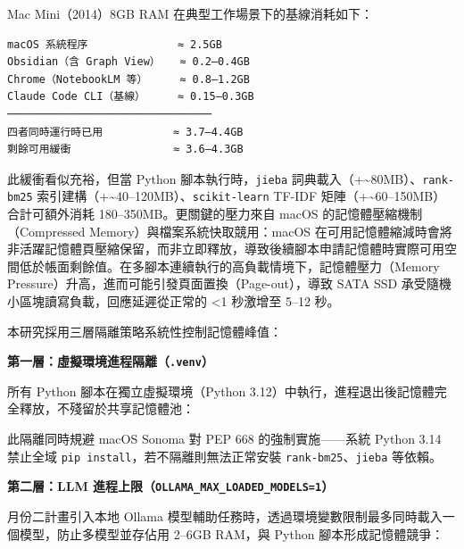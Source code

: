 Mac Mini（2014）8GB RAM 在典型工作場景下的基線消耗如下：

\begin{verbatim}
macOS 系統程序              ≈ 2.5GB
Obsidian（含 Graph View）   ≈ 0.2–0.4GB
Chrome（NotebookLM 等）     ≈ 0.8–1.2GB
Claude Code CLI（基線）     ≈ 0.15–0.3GB
────────────────────────────────
四者同時運行時已用           ≈ 3.7–4.4GB
剩餘可用緩衝                ≈ 3.6–4.3GB
\end{verbatim}

此緩衝看似充裕，但當 Python 腳本執行時，\texttt{jieba}
詞典載入（+\textasciitilde80MB）、\texttt{rank-bm25}
索引建構（+\textasciitilde40--120MB）、\texttt{scikit-learn} TF-IDF
矩陣（+\textasciitilde60--150MB）合計可額外消耗
180--350MB。更關鍵的壓力來自 macOS 的記憶體壓縮機制（Compressed
Memory）與檔案系統快取競用：macOS
在可用記憶體縮減時會將非活躍記憶體頁壓縮保留，而非立即釋放，導致後續腳本申請記憶體時實際可用空間低於帳面剩餘值。在多腳本連續執行的高負載情境下，記憶體壓力（Memory
Pressure）升高，進而可能引發頁面置換（Page-out），導致 SATA SSD
承受隨機小區塊讀寫負載，回應延遲從正常的 \textless1 秒激增至 5--12 秒。

本研究採用三層隔離策略系統性控制記憶體峰值：

\textbf{第一層：虛擬環境進程隔離（\texttt{.venv}）}

所有 Python 腳本在獨立虛擬環境（Python
3.12）中執行，進程退出後記憶體完全釋放，不殘留於共享記憶體池：

\begin{Shaded}
\begin{Highlighting}[]
 

\end{Highlighting}
\end{Shaded}

此隔離同時規避 macOS Sonoma 對 PEP 668 的強制實施------系統 Python 3.14
禁止全域 \texttt{pip\ install}，若不隔離則無法正常安裝
\texttt{rank-bm25}、\texttt{jieba} 等依賴。

\textbf{第二層：LLM 進程上限（\texttt{OLLAMA\_MAX\_LOADED\_MODELS=1}）}

月份二計畫引入本地 Ollama
模型輔助任務時，透過環境變數限制最多同時載入一個模型，防止多模型並存佔用
2--6GB RAM，與 Python 腳本形成記憶體競爭：

